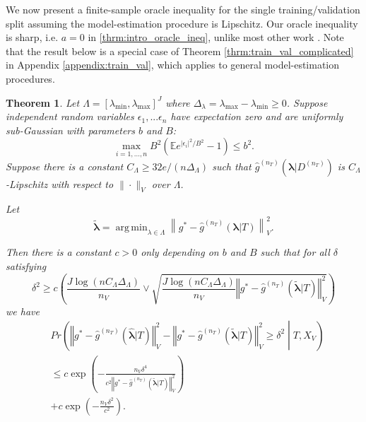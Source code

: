 \documentclass[12pt]{article} %
\newtheorem{theorem}{Theorem}
\theoremstyle{definition}
\DeclareMathOperator*{\argmin}{arg\,min}
\begin{document}
We now present a finite-sample oracle inequality for the single training/validation split assuming the model-estimation procedure is Lipschitz. Our oracle inequality is sharp, i.e. $a=0$ in \eqref{thrm:intro_oracle_ineq}, unlike most other work \citep{gyorfi2006distribution, lecue2012oracle, van2003unified}. Note that the result below is a special case of Theorem \ref{thrm:train_val_complicated} in Appendix \ref{appendix:train_val}, which applies to general model-estimation procedures.
\begin{theorem}
	\label{thrm:train_val}
	Let $\Lambda=[\lambda_{\min},\lambda_{\max}]^{J}$ where $\Delta_{\lambda} = \lambda_{\max} - \lambda_{\min} \ge 0$. Suppose independent random variables $\epsilon_1, ... \epsilon_n$ have expectation zero and are uniformly sub-Gaussian with parameters $b$ and $B$:
	$$
	\max_{i=1,...,n} B^2 \left ( \mathbb{E} e^{|\epsilon_i|^2/B^2} - 1 \right ) \le b^2.
	$$
	Suppose there is a constant $C_\Lambda \ge 32e/(n \Delta_{\Lambda})$ such that $\hat g^{(n_T)}(\boldsymbol{\lambda} |D^{(n_T)})$ is $C_\Lambda$-Lipschitz with respect to $\| \cdot \|_V$ over $\Lambda$.
	
	Let 
	\begin{equation}
	\tilde{\boldsymbol \lambda} = \argmin_{\lambda \in \Lambda} \left \| g^*-\hat{g}^{(n_T)}( \boldsymbol{\lambda} | T) \right \|_{V}^{2}.
	\label{eq:tilde_lambda_def}
	\end{equation}
	
	Then there is a constant $c>0$ only depending on $b$ and $B$ such that for all $\delta$ satisfying
	\begin{equation}
	\delta^{2}
	\ge
	c \left ( 
	\frac{J\log (n C_\Lambda \Delta_{\Lambda})}{n_{V}}
	\vee 
	\sqrt{\frac{J \log (n C_\Lambda \Delta_{\Lambda})}{n_{V}}\left\Vert g^* - \hat{g}^{(n_T)}( \tilde{\boldsymbol{\lambda}} | T)\right\Vert_{V}^2}
	\right )
	\label{thrm:train_val_delta}
	\end{equation}
	we have
	\begin{align}
	& Pr\left(
	\left\Vert g^* - \hat{g}^{(n_T)}( \hat{\boldsymbol{\lambda}} | T) \right\Vert _{V}^2 -
	\left\Vert g^* - \hat{g}^{(n_T)}( \tilde{\boldsymbol{\lambda}} | T) \right\Vert _{V}^2
	\ge\delta^2
	\middle | 
	T, X_V
	\right )\\
	&\le c\exp\left(-\frac{n_{V}\delta^{4}}{
		c^{2}
		\left\Vert g^* - \hat{g}^{(n_T)}( \tilde{\boldsymbol{\lambda}} | T) \right\Vert _{V}^2
	}\right) \\
	& +c\exp\left(-\frac{n_{V}\delta^{2}}{c^{2}}\right).
	\end{align}
	
\end{theorem}
\end{document}
